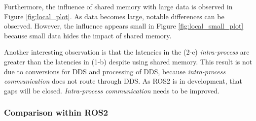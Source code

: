 \documentclass{sig-alternate-05-2015}
\begin{document}
Furthermore, the influence of shared memory with large data is observed in Figure \ref{fig:local_plot}.
As data becomes large, notable differences can be observed.
However, the influence appears small in Figure \ref{fig:local_small_plot} because small data hides the impact of shared memory.

Another interesting observation is that the latencies in the (2-c) \emph{intra-process} are greater than the latencies in (1-b) despite using shared memory.
This result is not due to conversions for DDS and processing of DDS, because \emph{intra-process communication} does not route through DDS.
As ROS2 is in development, that gaps will be closed.
\emph{Intra-process communication} needs to be improved.

\subsubsection{Comparison within ROS2}
\label{sec:ros2}
\end{document}
